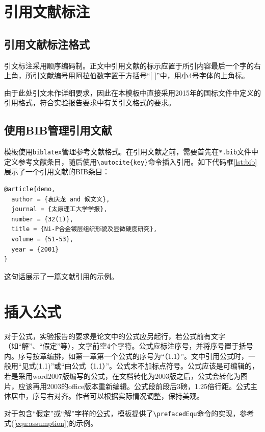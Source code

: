 \section{引用文献标注}

\subsection{引用文献标注格式}

引文标注采用顺序编码制。正文中引用文献的标示应置于所引内容最后一个字的右上角，所引文献编号用阿拉伯数字置于方括号“[ ]”中，用小4号字体的上角标。

由于此处引文未作详细要求，因此在本模板中直接采用2015年的国标文件中定义的引用格式，符合实验报告要求中有关引文格式的要求。

\subsection{使用BIB管理引用文献}

模板使用\texttt{biblatex}管理参考文献格式。在引用文献之前，需要首先在\texttt{*.bib}文件中定义参考文献条目，随后使用\texttt{\textbackslash autocite\{key\}}命令插入引用。如下代码框\ref{lst:bib}展示了一个引用文献的BIB条目：

\begin{lstlisting}[caption={BIB引文格式条目示例\label{lst:bib}}]
@article{demo,
  author = {袁庆龙 and 候文义},
  journal = {太原理工大学学报},
  number = {32(1)},
  title = {Ni-P合金镀层组织形貌及显微硬度研究},
  volume = {51-53},
  year = {2001}
}
\end{lstlisting}

这句话展示了一篇文献引用的示例\autocite{demo}。

\section{插入公式}

对于公式，实验报告的要求是论文中的公式应另起行，若公式前有文字（如“解”、“假定”等），文字前空4个字符。公式应标注序号，并将序号置于括号内。序号按章编排，如第一章第一个公式的序号为“（1.1）”。文中引用公式时，一般用“见式(1.1)”或“由公式（1.1）”。公式末不加标点符号。公式应该是可编辑的，若是采用word2007版编写的公式，在文档转化为2003版之后，公式会转化为图片，应该再用2003的office版本重新编辑。公式段前段后3磅，1.25倍行距。公式主体居中，序号右对齐。作者可以根据实际情况调整，保持美观。

对于包含“假定”或“解”字样的公式，模板提供了\texttt{\textbackslash prefacedEqu}命令的实现，参考式(\ref{equ:assumption})的示例。

